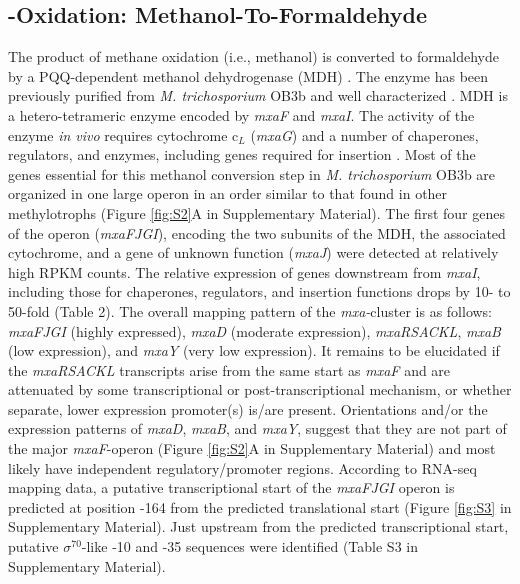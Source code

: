 \subsection{-Oxidation: Methanol-To-Formaldehyde}
The product of methane oxidation (i.e., methanol) is converted to formaldehyde by a PQQ-dependent methanol dehydrogenase (MDH) \cite{anthony1982, anthony2002, yamada1992, anthony1994}. %
The enzyme has been previously purified from \textit{M. trichosporium} OB3b and well characterized \cite{yamada1992}.  %
MDH is a hetero-tetrameric enzyme encoded by \textit{mxaF} and \textit{mxaI}.
The activity of the enzyme \textit{in vivo} requires cytochrome c$_L$ (\textit{mxaG}) and a number of chaperones, regulators, and enzymes, including genes required for  insertion \cite{anthony1994, anthony2002}.
Most of the genes essential for this methanol conversion step in \textit{M. trichosporium} OB3b are organized in one large operon in an order similar to that found in other methylotrophs (Figure \ref{fig:S2}A in Supplementary Material).
The first four genes of the operon (\textit{mxaFJGI}), encoding the two subunits of the MDH, the associated cytochrome, and a gene of unknown function (\textit{mxaJ}) were detected at relatively high RPKM counts.
The relative expression of genes downstream from \textit{mxaI}, including those for chaperones, regulators, and  insertion functions drops by 10- to 50-fold (Table 2).
The overall mapping pattern of the \textit{mxa-}cluster is as follows: \textit{mxaFJGI} (highly expressed), \textit{mxaD} (moderate expression), \textit{mxaRSACKL}, \textit{mxaB} (low expression), and \textit{mxaY} (very low expression).
It remains to be elucidated if the \textit{mxaRSACKL} transcripts arise from the same start as \textit{mxaF} and are attenuated by some transcriptional or post-transcriptional mechanism, or whether separate, lower expression promoter(s) is/are present.
Orientations and/or the expression patterns of \textit{mxaD}, \textit{mxaB}, and \textit{mxaY}, suggest that they are not part of the major \textit{mxaF}-operon (Figure \ref{fig:S2}A in Supplementary Material) and most likely have independent regulatory/promoter regions.
According to RNA-seq mapping data, a putative transcriptional start of the \textit{mxaFJGI} operon is predicted at position -164 from the predicted translational start (Figure \ref{fig:S3} in Supplementary Material).
Just upstream from the predicted transcriptional start, putative $\sigma^{70}$-like -10 and -35 sequences were identified (Table S3 in Supplementary Material).

